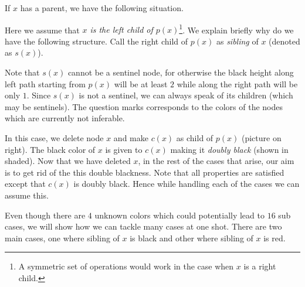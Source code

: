 \documentclass[10pt]{article}
\newcommand{\node}{\texttt{node}}
\begin{document}
If $x$ has a parent, we have the following situation. 
\begin{center}
\quad
{}\quad
\end{center}
Here we assume that \emph{$x$ is the left child of $p(x)$}\footnote{A
	symmetric set of operations would work in the case when $x$ is a right
child.}. We explain briefly why do we have the following structure. Call the
right child of $p(x)$ as \emph{sibling} of $x$ (denoted as $s(x)$). 

Note that $s(x)$ cannot be a sentinel node, for otherwise the black height
along left path starting from $p(x)$ will be at least $2$ while along the
right path will be only $1$. Since $s(x)$ is not a sentinel, we can always
speak of its children (which may be sentinels). The question marks corresponds
to the colors of the nodes which are currently not inferable.

In this case, we delete node $x$ and make $c(x)$ as child of $p(x)$ (picture
on right). The black color of $x$ is given to $c(x)$ making it \emph{doubly
black} (shown in shaded). Now that we have deleted $x$, in the rest of the
cases that arise, our aim is to get rid of the this double blackness. Note
that all properties are satisfied except that $c(x)$ is doubly black. Hence
while handling each of the cases we can assume this. 

Even though there are $4$ unknown colors which
could potentially lead to $16$ sub cases, we will show how we can tackle many
cases at one shot.  There are two main cases, one where sibling of $x$ is
black and other where sibling of $x$ is red. 
\end{document}
